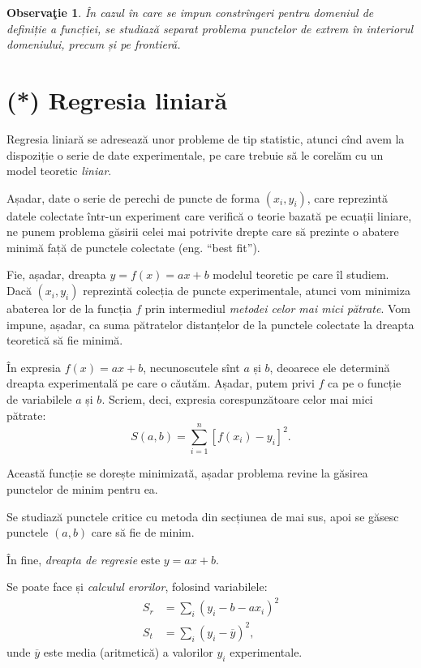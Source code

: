\documentclass[11pt,a4paper]{article}
\theoremstyle{dotless}
\theoremstyle{dotlessdr}
\newtheorem{remark}{Observa\c{t}ie}[section]
\begin{document}
\begin{remark}\label{rk:frontiera}
  În cazul în care se impun constrîngeri pentru domeniul de definiție a funcției,
  se studiază separat problema punctelor de extrem în interiorul domeniului,
  precum și pe frontieră.
\end{remark}




\section{(*) Regresia liniară}
\label{sec:reg-lin}

Regresia liniară se adresează unor probleme de tip statistic, atunci cînd avem
la dispoziție o serie de date experimentale, pe care trebuie să le corelăm cu
un model teoretic \emph{liniar}.

Așadar, date o serie de perechi de puncte de forma $(x_i, y_i)$, care reprezintă
datele colectate într-un experiment care verifică o teorie bazată pe ecuații
liniare, ne punem problema găsirii celei mai potrivite drepte care să prezinte
o abatere minimă față de punctele colectate (eng. ``best fit'').

Fie, așadar, dreapta $y = f(x) = ax + b$ modelul teoretic pe care îl studiem.
Dacă $(x_i, y_i)$ reprezintă colecția de puncte experimentale, atunci vom minimiza
abaterea lor de la funcția $f$ prin intermediul \emph{metodei celor mai mici pătrate}.
Vom impune, așadar, ca suma pătratelor distanțelor de la punctele colectate la
dreapta teoretică să fie minimă.

În expresia $f(x) = ax + b$, necunoscutele sînt $a$ și $b$, deoarece ele determină
dreapta experimentală pe care o căutăm. Așadar, putem privi $f$ ca pe o funcție
de variabilele $a$ și $b$. Scriem, deci, expresia corespunzătoare celor mai
mici pătrate:
\[
  S(a, b) = \sum_{i = 1}^n [ f(x_i) - y_i ]^2.
\]

Această funcție se dorește minimizată, așadar problema revine la găsirea punctelor
de minim pentru ea.

Se studiază punctele critice cu metoda din secțiunea de mai sus, apoi se
găsesc punctele $(a, b)$ care să fie de minim.

În fine, \emph{dreapta de regresie} este $y = ax + b$.

Se poate face și \emph{calculul erorilor}, folosind variabilele:
\begin{align*}
  S_r &= \sum_i (y_i - b - ax_i)^2 \\
  S_t &= \sum_i (y_i - \overline{y})^2,
\end{align*}
unde $\overline{y}$ este media (aritmetică) a valorilor $y_i$ experimentale.
\end{document}

